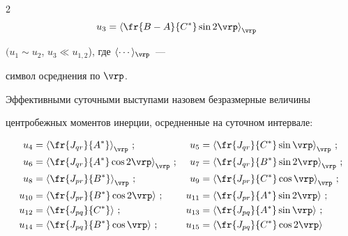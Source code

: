 \begin{multicols}{2}
\begin{align*}
    u_3 &=\left\langle\fr{B-A}{C^*} \sin 2 \vrp\right\rangle_\vrp


    \end{align*}


$(u_1\sim u_2$, $u_3\ll u_{1,2}$), где $\langle\cdots\rangle_\vrp$~--- 


символ осреднения по $\vrp$.





Эффективными суточными выступами назовем безразмерные величины


центробежных моментов инерции, осредненные на суточном   интервале:


\begin{align*}


u_4 &=\left\langle\fr{J_{qr}}{ A^*}\right\rangle_\vrp \,; & 


u_5 &= \left\langle\fr{J_{qr}}{ C^*}\sin \vrp\right\rangle_\vrp \,;\\


u_6 &= \left\langle\fr{J_{qr}}{A^*}\cos 2 \vrp\right\rangle_\vrp \,;& 


u_7 & =\left\langle\fr{J_{qr}}{ B^*}\sin 2\vrp\right\rangle_\vrp \,;\\


u_8 &= \left\langle\fr{J_{pr}}{ B^*}\right\rangle_\vrp \,; & 


u_9 &= \left\langle\fr{J_{pr}}{C^*}\cos \vrp\right\rangle_\vrp \,;\\


u_{10} &= \left\langle\fr{J_{pr}}{ B^*}\cos 2 \vrp\right\rangle \,;& 


u_{11} &= \left\langle\fr{J_{pr}}{ A^*}\sin 2\vrp\right\rangle \,;\\


u_{12} &=\left \langle\fr{J_{pq}}{C^*}\right\rangle\,; & 


u_{13} &= \left\langle\fr{J_{pq}}{A^*}\sin \vrp\right\rangle \,;\\


u_{14} &= \left\langle\fr{J_{pq}}{ B^*}\cos \vrp\right\rangle\,; & 


u_{15} &= \left\langle\fr{J_{pq}}{ C^*}\cos 2\vrp\right\rangle


\end{align*}





\vspace*{-9pt}


\noindent



\end{multicols}
